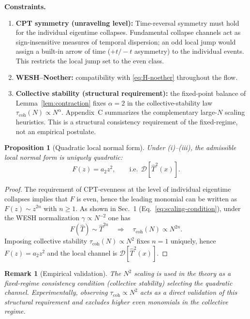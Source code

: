 \documentclass[12pt,a4paper]{article}
\newtheorem{proposition}{Proposition}[section]
\newtheorem{remark}{Remark}[section]
\numberwithin{equation}{section}
\begin{document}
\noindent\textbf{Constraints.}
\begin{enumerate}[label=(\roman*),leftmargin=1.8cm,itemsep=0.2em]
\item \textbf{CPT symmetry (unraveling level):} Time-reversal symmetry must hold for the individual eigentime collapses. Fundamental collapse channels act as sign-insensitive measures of temporal dispersion; an odd local jump would assign a built-in arrow of time ($+t/-t$ asymmetry) to the individual events. This restricts the local jump set to the even class.
\item \textbf{WESH–Noether:} compatibility with \eqref{eq:H-noether} throughout the flow.
\item \textbf{Collective stability (structural requirement):}
the fixed-point balance of Lemma~\ref{lem:contraction} fixes $\alpha = 2$ in the collective-stability law $\tau_{\mathrm{coh}}(N)\propto N^\alpha$. Appendix~C summarizes the complementary large-$N$ scaling heuristics. This is a structural consistency requirement of the fixed-regime, not an empirical postulate.
\end{enumerate}

\begin{proposition}[Quadratic local normal form]\label{prop:I-quadratic}
Under (i)–(iii), the admissible local normal form is uniquely quadratic:
\[
F(z)=a_2 z^2,\qquad \text{i.e.}\ \ \mathcal D[\hat T^2(x)].
\]
\end{proposition}

\begin{proof}
The requirement of CPT-evenness at the level of individual eigentime collapses implies that $F$ is even, hence the leading monomial can be written as $F(z) \sim z^{2n}$ with $n \ge 1$. As shown in Sec.~1 (Eq.~\eqref{eq:scaling-condition}), under the WESH normalization $\gamma \propto N^{-2}$ one has
\[
F(\hat T) \sim \hat T^{2n} \quad \Rightarrow \quad \tau_{\mathrm{coh}}(N) \propto N^{2n}.
\]
Imposing collective stability $\tau_{\mathrm{coh}}(N) \propto N^{2}$ fixes $n = 1$ uniquely, hence $F(z) = a_2 z^2$ and the local channel is $\mathcal{D}[\hat T^2(x)]$.
\end{proof}

\begin{remark}[Empirical validation]
The $N^2$ scaling is used in the theory as a fixed-regime consistency condition (collective stability) selecting the quadratic channel. Experimentally, observing $\tau_{\mathrm{coh}} \propto N^2$ acts as a direct validation of this structural requirement and excludes higher even monomials in the collective regime.
\end{remark}
\end{document}
